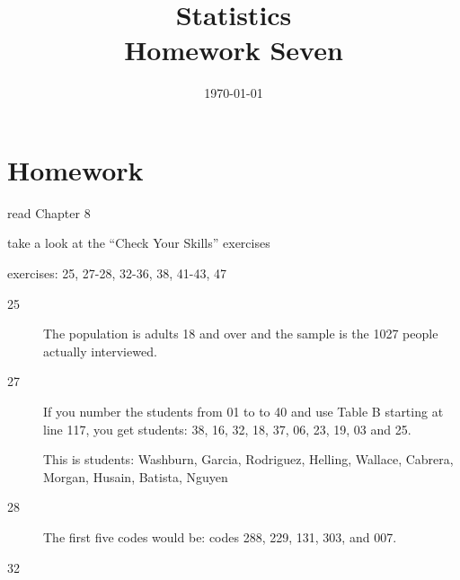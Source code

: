 \documentclass[letterpaper]{exam}
\title{Statistics \\ Homework Seven}
\date{\today}
\author{}
\begin{document}
  \maketitle

  \section{Homework}
    \begin{itemize*}
      \item read Chapter 8 
      \item take a look at the ``Check Your Skills'' exercises
      \item exercises: 25, 27-28, 32-36, 38, 41-43, 47
    \end{itemize*}

  \ifprintanswers
    \begin{description}

      \item[25] The population is adults 18 and over and the sample is the 1027
        people actually interviewed.

      \item[27] If you number the students from 01 to to 40 and use Table B
        starting at line 117, you get students: 38, 16, 32, 18, 37, 06, 23,
        19, 03 and 25.

        This is students: Washburn, Garcia, Rodriguez, Helling, Wallace,
        Cabrera, Morgan, Husain, Batista, Nguyen

      \item[28] The first five codes would be: codes 288, 229, 131, 303, and 007.

      \item[32] 


\end{description}
\end{document}
